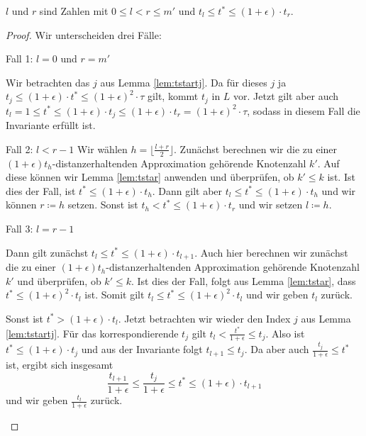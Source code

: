 \begin{lemma}
	\label{lem:invariantmdps}
	$l$ und $r$ sind Zahlen mit $0 \leq l < r \leq m'$ und $t_l \leq t^* \leq (1 + \epsilon)\cdot t_r$.
\end{lemma}
\begin{proof}
	Wir unterscheiden drei Fälle:
	\begin{description}[topsep=0mm, itemsep=0mm]
		\item{Fall 1:} $l = 0$ und $r = m'$
		
		Wir betrachten das $j$ aus Lemma \ref{lem:tstartj}. 
		Da für dieses $j$ ja $t_j \leq (1 + \epsilon) \cdot t^* \leq (1 + \epsilon)^2 \cdot \tau$ gilt, kommt $t_j$ in $L$ vor. 
		Jetzt gilt aber auch $t_l = 1 
		\leq t^* 
		\leq (1 + \epsilon) \cdot t_j 
		\leq (1 + \epsilon) \cdot t_r 
		= (1 + \epsilon)^2 \cdot \tau$, sodass in diesem Fall die Invariante erfüllt ist.
		
		\item{Fall 2:} 
		$l < r-1$
		Wir wählen $h = \lfloor \frac{l + r}{2} \rfloor$. 
		Zunächst berechnen wir die zu einer $(1 + \epsilon)t_h$-distanzerhaltenden Approximation gehörende Knotenzahl $k'$. 
		Auf diese können wir Lemma \ref{lem:tstar} anwenden und überprüfen, ob $k' \leq k$ ist.
		Ist dies der Fall, ist $t^* \leq (1 + \epsilon) \cdot t_h$. 
		Dann gilt aber $t_l \leq t^* \leq  (1 + \epsilon) \cdot t_h$ und wir können $r \coloneqq h$ setzen. 
		Sonst ist $t_h < t^* \leq (1 + \epsilon)\cdot t_r$ und wir setzen $l \coloneqq h$.
		
		\item{Fall 3:} $l = r - 1$
		
		Dann gilt zunächst $t_l \leq t^* \leq (1 + \epsilon)\cdot t_{l+1}$. 
		Auch hier berechnen wir zunächst die zu einer $(1 + \epsilon)t_h$-distanzerhaltenden Approximation gehörende Knotenzahl $k'$ und überprüfen, ob $k' \leq k$.
		Ist dies der Fall, folgt aus Lemma \ref{lem:tstar}, dass $t^* \leq (1 + \epsilon)^2 \cdot t_l$ ist. 
		Somit gilt $t_l \leq t^* \leq (1 + \epsilon)^2 \cdot t_l$ und wir geben $t_l$ zurück.
		
		Sonst ist $t^* > (1 + \epsilon)\cdot t_l$. 
		Jetzt betrachten wir wieder den Index $j$ aus Lemma \ref{lem:tstartj}. 
		Für das korrespondierende $t_j$ gilt $t_l < \frac{t^*}{1 + \epsilon} \leq t_j$. Also ist $t^* \leq (1 + \epsilon) \cdot t_j$ und aus der Invariante folgt $t_{l+1} \leq t_j$.
		Da aber auch $\frac{t_j}{1 + \epsilon} \leq t^*$ ist, ergibt sich insgesamt 
		\[
		\frac{t_{l+1}}{1 + \epsilon} 
		\leq \frac{t_j}{1 + \epsilon} 
		\leq t^* 
		\leq (1 + \epsilon) \cdot t_{l+1}
		\]
		und wir geben $\frac{t_l}{1 + \epsilon}$ zurück.
	\end{description}
\end{proof}

